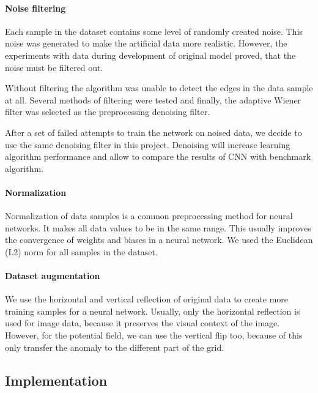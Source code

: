 \documentclass{article}
\begin{document}
\paragraph{Noise filtering}\label{noise-filtering}

Each sample in the dataset contains some level of randomly created
noise. This noise was generated to make the artificial data more
realistic. However, the experiments with data during development of
original model \cite{lenka} proved, that the noise must be filtered out. 

Without filtering the algorithm was unable to detect the edges in the data sample at all.
Several methods of filtering were tested and finally, the adaptive
Wiener filter was selected as the preprocessing denoising filter.

After a set of failed attempts to train the network on noised data, we
decide to use the same denoising filter in this project. Denoising will
increase learning algorithm performance and allow to compare the results
of CNN with benchmark algorithm.

\paragraph{Normalization}\label{normalization}

Normalization of data samples is a common preprocessing method for
neural networks. It makes all data values to be in the same range. This
usually improves the convergence of weights and biases in a neural
network. We used the Euclidean (L2) norm for all samples in the dataset.

\paragraph{Dataset augmentation}\label{dataset-augmentation}

We use the horizontal and vertical reflection of original data to create
more training samples for a neural network. Usually, only the horizontal
reflection is used for image data, because it preserves the visual
context of the image. However, for the potential field, we can use the
vertical flip too, because of this only transfer the anomaly to the
different part of the grid.

\subsection{Implementation}\label{implementation}
\end{document}
